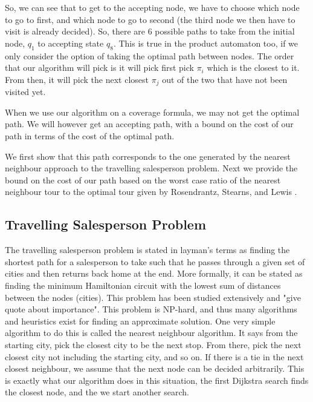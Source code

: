 So, we can see that to get to the accepting node, we have to choose which node to go to first, and which node to go to second (the third node we then have to visit is already decided). So, there are 6 possible paths to take from the initial node, $q_1$ to accepting state $q_8$. This is true in the product automaton too, if we only consider the option of taking the optimal path between nodes. The order that our algorithm will pick is it will pick first pick $\pi_i$ which is the closest to it. From then, it will pick the next closest $\pi_j$ out of the two that have not been visited yet.



When we use our algorithm on a coverage formula, we may not get the optimal path. We will however get an accepting path, with a bound on the cost of our path in terms of the cost of the optimal path. 

We first show that this path corresponds to the one generated by the nearest neighbour approach to the travelling salesperson problem. Next we provide the bound on the cost of our path based on the worst case ratio of the nearest neighbour tour to the optimal tour given by Rosendrantz, Stearns, and Lewis \cite{rosenkrantz74}. 

\subsection{Travelling Salesperson Problem}
The travelling salesperson problem is stated in layman's terms as finding the shortest path for a salesperson to take such that he passes through a given set of cities and then returns back home at the end. More formally, it can be stated as finding the minimum Hamiltonian circuit with the lowest sum of distances between the nodes (cities). This problem has been studied extensively and "give quote about importance". This problem is NP-hard, and thus many algorithms and heuristics exist for finding an approximate solution. One very simple algorithm to do this is called the nearest neighbour algorithm. It says from the starting city, pick the closest city to be the next stop. From there, pick the next closest city not including the starting city, and so on. If there is a tie in the next closest neighbour, we assume that the next node can be decided arbitrarily. This is exactly what our algorithm does in this situation, the first Dijkstra search finds the closest node, and the we start another search. 

